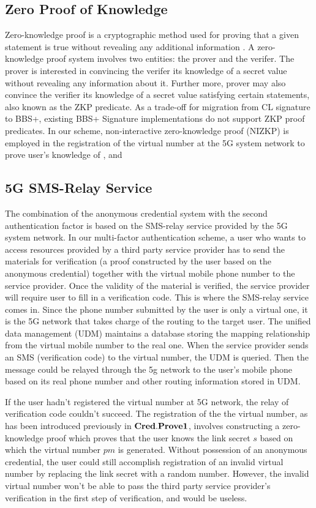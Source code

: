 \subsection{Zero Proof of Knowledge}
Zero-knowledge proof is a  cryptographic method used for proving that a given statement is true without revealing any additional information . A zero-knowledge proof system involves two entities: the prover and the verifer. The prover is interested in convincing the verifer its knowledge of a secret value without revealing any information about it. Further more, prover may also convince the verifier its knowledge of a secret value satisfying certain statements, also known as the ZKP predicate. As a trade-off for migration from CL signature to BBS+, existing BBS+ Signature implementations do not support ZKP proof predicates. 
In our scheme, non-interactive zero-knowledge proof (NIZKP) is employed in the registration of the virtual number at the 5G system network to prove user's knowledge of , and 


\subsection{5G SMS-Relay Service}
The combination of the anonymous credential system with the second authentication factor is based on the SMS-relay service provided by the 5G system network. In our multi-factor authentication scheme, a user who wants to access resources provided by a third party service provider has to send the materials for verification (a proof constructed by the user based on the anonymous credential) together with the virtual mobile phone number to the service provider. Once the validity of the material is verified, the service provider will require user to fill in a verification code. This is where the SMS-relay service comes in. Since the phone number submitted by the user is only a virtual one, it is the 5G network that takes charge of the routing to the target user. The unified data management (UDM) maintains a database storing the mapping relationship from the virtual mobile number to the real one. When the service provider sends an SMS (verification code) to the virtual number, the UDM is queried. Then the message could be relayed through the 5g network to the user's mobile phone based on its real phone number and other routing information stored in UDM.

If the user hadn't registered the virtual number at 5G network, the relay of verification code couldn't succeed. The registration of the the virtual number, as has been introduced previously in $\bf{Cred.Prove1}$, involves constructing a zero-knowledge proof which proves that the user knows the link secret $s$ based on which the virtual number $pm$ is generated. Without possession of an anonymous credential, the user could still accomplish registration of an invalid virtual number by replacing the link secret with a random number. However, the invalid virtual number won't be able to pass the third party service provider's verification in the first step of verification, and would be useless.

